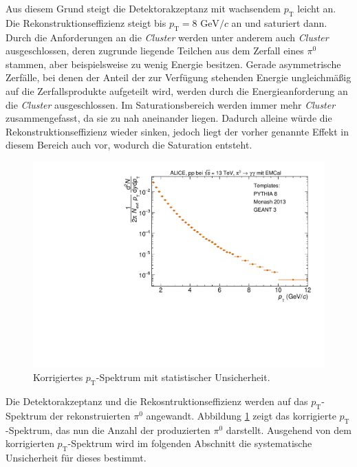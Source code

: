 Aus diesem Grund steigt die Detektorakzeptanz mit wachsendem $p_\text{T}$ leicht an.
\newpage
\noindent
Die Rekonstruktionseffizienz steigt bis $p_\text{T} = 8 \text{ GeV}/c$ an und saturiert dann.
Durch die Anforderungen an die \textit{Cluster} werden unter anderem auch \textit{Cluster} ausgeschlossen, deren zugrunde liegende Teilchen aus dem Zerfall eines $\pi^{0}$ stammen, aber beispielsweise zu wenig Energie besitzen.
Gerade asymmetrische Zerfälle, bei denen der Anteil der zur Verfügung stehenden Energie ungleichmäßig auf die Zerfallsprodukte aufgeteilt wird, werden durch die Energieanforderung an die \textit{Cluster} ausgeschlossen.
Im Saturationsbereich werden immer mehr \textit{Cluster} zusammengefasst, da sie zu nah aneinander liegen.
Dadurch alleine würde die Rekonstruktionseffizienz wieder sinken, jedoch liegt der vorher genannte Effekt in diesem Bereich auch vor, wodurch die Saturation entsteht.
\begin{figure}[t!]
\centering
\includegraphics[width=.65\linewidth]{KorrigierterYieldNurStat_Data_2016.pdf}
\caption{Korrigiertes $p_\text{T}$-Spektrum mit statistischer Unsicherheit.
}
\label{fig:YieldStatUncer}
\end{figure}
\newline
Die Detektorakzeptanz und die Rekosntruktionseffizienz werden auf das $p_\text{T}$-Spektrum der rekonstruierten $\pi^{0}$ angewandt.
Abbildung \ref{fig:YieldStatUncer} zeigt das korrigierte $p_\text{T}$-Spektrum, das nun die Anzahl der produzierten $\pi^{0}$ darstellt.
Ausgehend von dem korrigierten $p_\text{T}$-Spektrum wird im folgenden Abschnitt die systematische Unsicherheit für dieses bestimmt.